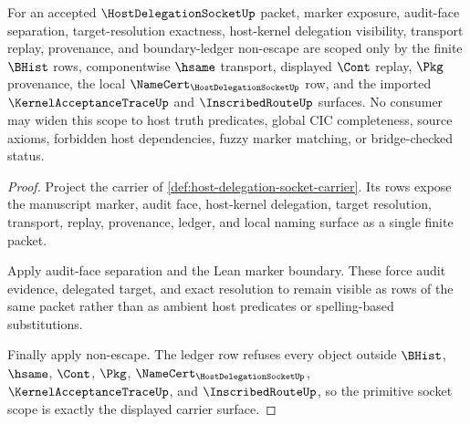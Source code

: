 \begin{theorem}
\label{thm:host-delegation-socket-primitive-scope-binding}
For an accepted $\HostDelegationSocketUp$ packet, marker exposure, audit-face separation, target-resolution exactness, host-kernel delegation visibility, transport replay, provenance, and boundary-ledger non-escape are scoped only by the finite $\BHist$ rows, componentwise $\hsame$ transport, displayed $\Cont$ replay, $\Pkg$ provenance, the local $\NameCert_{\HostDelegationSocketUp}$ row, and the imported $\KernelAcceptanceTraceUp$ and $\InscribedRouteUp$ surfaces. No consumer may widen this scope to host truth predicates, global CIC completeness, source axioms, forbidden host dependencies, fuzzy marker matching, or bridge-checked status.
\end{theorem}
\begin{proof}
Project the carrier of \autoref{def:host-delegation-socket-carrier}. Its rows expose the manuscript marker, audit face, host-kernel delegation, target resolution, transport, replay, provenance, ledger, and local naming surface as a single finite packet.

Apply audit-face separation and the Lean marker boundary. These force audit evidence, delegated target, and exact resolution to remain visible as rows of the same packet rather than as ambient host predicates or spelling-based substitutions.

Finally apply non-escape. The ledger row refuses every object outside $\BHist$, $\hsame$, $\Cont$, $\Pkg$, $\NameCert_{\HostDelegationSocketUp}$, $\KernelAcceptanceTraceUp$, and $\InscribedRouteUp$, so the primitive socket scope is exactly the displayed carrier surface.
\end{proof}

